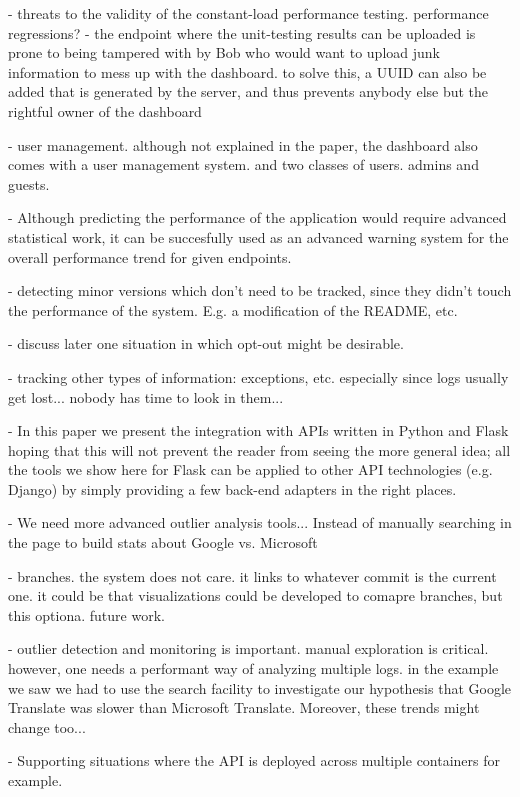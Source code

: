 - threats to the validity of the constant-load performance testing. performance regressions? 
- the endpoint where the unit-testing results can be uploaded is prone to being tampered with by Bob who would want to upload junk information to mess up with the dashboard. to solve this, a UUID can also be added that is generated by the server, and thus prevents anybody else but the rightful owner of the dashboard 

- user management. although not explained in the paper, the dashboard also comes with a user management system. and two classes of users. admins and guests.

- Although predicting the performance of the application would require advanced statistical work, it can be succesfully used as an advanced warning system for the overall performance trend for given endpoints.

- detecting minor versions which don't need to be tracked, since they didn't touch the performance of the system. E.g. a modification of the README, etc. 

- discuss later one situation in which opt-out might be desirable. 

- tracking other types of information: exceptions, etc. especially since logs usually get lost... nobody has time to look in them...

-  In this paper we present the integration with APIs written in Python and Flask hoping that this will not prevent the reader from seeing the more general idea; all the tools we show here for Flask can be applied to other API technologies (e.g. Django) by simply providing a few back-end adapters in the right places.

- We need more advanced outlier analysis tools... Instead of manually searching in the page to build stats about Google vs. Microsoft

- branches. the system does not care. it links to whatever commit is the current one. it could be that visualizations could be developed to comapre branches, but this optiona. future work. 

- outlier detection and monitoring is important. manual exploration is critical. however, one needs a performant way of analyzing multiple logs. in the example we saw we had to use the search facility to investigate our hypothesis that Google Translate was slower than Microsoft Translate. Moreover, these trends might change too... 


-   Supporting situations where the API is deployed across multiple containers for example.

